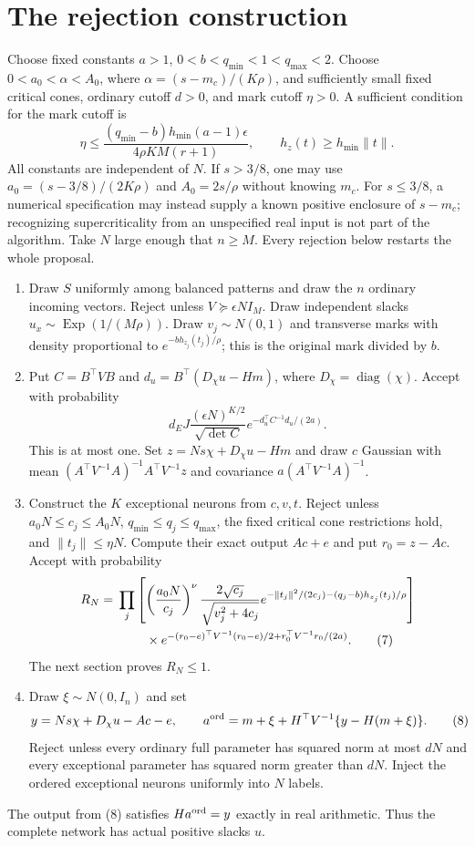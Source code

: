 \documentclass[11pt]{article}
\begin{document}
\section{The rejection construction}
Choose fixed constants $a>1$, $0<b<q_{\min}<1<q_{\max}<2$.
Choose $0<a_0<\alpha<A_0$, where $\alpha=(s-m_c)/(K\rho)$,
and sufficiently small fixed critical cones, ordinary cutoff $d>0$,
and mark cutoff $\eta>0$. A sufficient condition for the mark cutoff is
\[
 \eta\le\frac{(q_{\min}-b)h_{\min}(a-1)\epsilon}
                   {4\rho K M(r+1)},\qquad
 h_z(t)\ge h_{\min}\|t\|.                              \tag{5}
\]
All constants are independent of $N$. If $s>3/8$, one may use
$a_0=(s-3/8)/(2K\rho)$ and $A_0=2s/\rho$ without knowing $m_c$.
For $s\le3/8$, a numerical specification may instead supply a known
positive enclosure of $s-m_c$; recognizing supercriticality from an
unspecified real input is not part of the algorithm.
Take $N$ large enough that $n\ge M$.
Every rejection below restarts the whole proposal.

\begin{enumerate}
\item Draw $S$ uniformly among balanced patterns and draw the $n$
ordinary incoming vectors. Reject unless $V\succeq\epsilon NI_M$.
Draw independent slacks $u_x\sim\operatorname{Exp}(1/(M\rho))$.
Draw $v_j\sim N(0,1)$ and transverse marks with density proportional
to $e^{-b h_{z_j}(t_j)/\rho}$; this is the original mark divided by $b$.
\item Put $C=B^\top VB$ and $d_u=B^\top(D_\chi u-Hm)$, where
$D_\chi=\operatorname{diag}(\chi)$. Accept with probability
\[
 d_EJ\frac{(\epsilon N)^{K/2}}{\sqrt{\det C}}
                       e^{-d_u^\top C^{-1}d_u/(2a)}.    \tag{6}
\]
This is at most one. Set $z=Ns\chi+D_\chi u-Hm$ and draw $c$ Gaussian
with mean $(A^\top V^{-1}A)^{-1}A^\top V^{-1}z$ and covariance
$a(A^\top V^{-1}A)^{-1}$.
\item Construct the $K$ exceptional neurons from $c,v,t$. Reject unless
$a_0N\le c_j\le A_0N$, $q_{\min}\le q_j\le q_{\max}$, the fixed
critical cone restrictions hold, and $\|t_j\|\le\eta N$.
Compute their exact output $Ac+e$ and put $r_0=z-Ac$.
Accept with probability
\begin{align}
 R_N={}&\prod_j\left[
 \left(\frac{a_0N}{c_j}\right)^\nu
 \frac{2\sqrt{c_j}}{\sqrt{v_j^2+4c_j}}
 e^{-\|t_j\|^2/(2c_j)-(q_j-b)h_{z_j}(t_j)/\rho}\right] \notag\\
 &\hspace{8mm}\times
 e^{-(r_0-e)^\top V^{-1}(r_0-e)/2+r_0^\top V^{-1}r_0/(2a)}. \tag{7}
\end{align}
The next section proves $R_N\le1$.
\item Draw $\xi\sim N(0,I_n)$ and set
\[
 y=Ns\chi+D_\chi u-Ac-e,\qquad
 a^{\rm ord}=m+\xi+H^\top V^{-1}\{y-H(m+\xi)\}.         \tag{8}
\]
Reject unless every ordinary full parameter has squared norm at most
$dN$ and every exceptional parameter has squared norm greater than
$dN$. Inject the ordered exceptional neurons uniformly into $N$ labels.
\end{enumerate}
The output from (8) satisfies $Ha^{\rm ord}=y$ exactly in real
arithmetic. Thus the complete network has actual positive slacks $u$.
\end{document}
